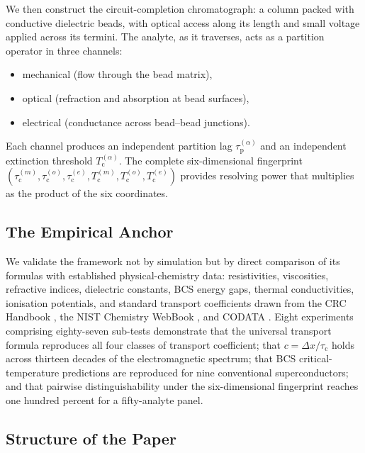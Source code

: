 \documentclass[twocolumn,10pt,a4paper]{article}
\theoremstyle{definition}
\theoremstyle{remark}
\newcommand{\Tcrit}{T_{\mathrm{c}}}
\newcommand{\tauP}{\tau_{\mathrm{p}}}
\newcommand{\tauC}{\tau_{\mathrm{c}}}
\newcommand{\tauM}{\tau_{\mathrm{c}}^{(m)}}
\newcommand{\tauO}{\tau_{\mathrm{c}}^{(o)}}
\newcommand{\tauE}{\tau_{\mathrm{c}}^{(e)}}
\newcommand{\TcM}{T_{\mathrm{c}}^{(m)}}
\newcommand{\TcO}{T_{\mathrm{c}}^{(o)}}
\newcommand{\TcE}{T_{\mathrm{c}}^{(e)}}
\begin{document}
We then construct the circuit-completion chromatograph: a column packed with conductive dielectric beads, with optical access along its length and small voltage applied across its termini. The analyte, as it traverses, acts as a partition operator in three channels:
\begin{itemize}[leftmargin=1.2em]
\item mechanical (flow through the bead matrix),
\item optical (refraction and absorption at bead surfaces),
\item electrical (conductance across bead--bead junctions).
\end{itemize}
Each channel produces an independent partition lag $\tauP^{(\alpha)}$ and an independent extinction threshold $\Tcrit^{(\alpha)}$. The complete six-dimensional fingerprint $(\tauM, \tauO, \tauE, \TcM, \TcO, \TcE)$ provides resolving power that multiplies as the product of the six coordinates.

\subsection{The Empirical Anchor}

We validate the framework not by simulation but by direct comparison of its formulas with established physical-chemistry data: resistivities, viscosities, refractive indices, dielectric constants, BCS energy gaps, thermal conductivities, ionisation potentials, and standard transport coefficients drawn from the CRC Handbook \citep{haynes2016,lide2010}, the NIST Chemistry WebBook \citep{nist_webbook}, and CODATA \citep{nist_codata}. Eight experiments comprising eighty-seven sub-tests demonstrate that the universal transport formula reproduces all four classes of transport coefficient; that $c = \Delta x / \tauC$ holds across thirteen decades of the electromagnetic spectrum; that BCS critical-temperature predictions are reproduced for nine conventional superconductors; and that pairwise distinguishability under the six-dimensional fingerprint reaches one hundred percent for a fifty-analyte panel.

\subsection{Structure of the Paper}
\end{document}

